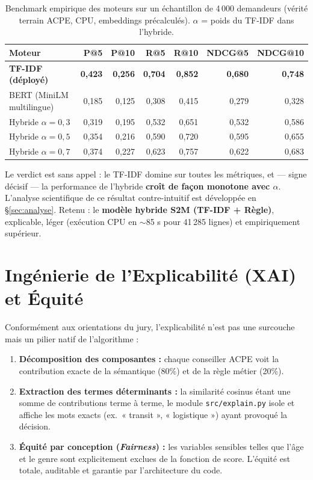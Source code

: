 \documentclass[11pt,a4paper]{article}
\begin{document}
\begin{table}[h]
\centering
\caption{Benchmark empirique des moteurs sur un échantillon de 4\,000 demandeurs (vérité terrain
ACPE, CPU, embeddings précalculés). $\alpha$ = poids du TF-IDF dans l'hybride.}
\label{tab:benchmark}
\small
\begin{tabular}{@{}lrrrrrr@{}}
\toprule
\textbf{Moteur} & \textbf{P@5} & \textbf{P@10} & \textbf{R@5} & \textbf{R@10} & \textbf{NDCG@5} & \textbf{NDCG@10} \\
\midrule
\textbf{TF-IDF (déployé)}          & \textbf{0,423} & \textbf{0,256} & \textbf{0,704} & \textbf{0,852} & \textbf{0,680} & \textbf{0,748} \\
BERT (MiniLM multilingue)          & 0,185 & 0,125 & 0,308 & 0,415 & 0,279 & 0,328 \\
Hybride $\alpha=0{,}3$             & 0,319 & 0,195 & 0,532 & 0,651 & 0,532 & 0,586 \\
Hybride $\alpha=0{,}5$             & 0,354 & 0,216 & 0,590 & 0,720 & 0,595 & 0,655 \\
Hybride $\alpha=0{,}7$             & 0,374 & 0,227 & 0,623 & 0,757 & 0,622 & 0,683 \\
\bottomrule
\end{tabular}
\end{table}

Le verdict est sans appel : le TF-IDF domine sur toutes les métriques, et — signe décisif — la
performance de l'hybride \textbf{croît de façon monotone avec $\alpha$}. L'analyse scientifique de
ce résultat contre-intuitif est développée en \S\ref{sec:analyse}. Retenu : le
\textbf{modèle hybride S2M (TF-IDF + Règle)}, explicable, léger (exécution CPU en $\sim$85 s pour
41\,285 lignes) et empiriquement supérieur.

\section{Ingénierie de l'Explicabilité (XAI) et Équité}
Conformément aux orientations du jury, l'explicabilité n'est pas une surcouche mais un pilier
natif de l'algorithme :
\begin{enumerate}
  \item \textbf{Décomposition des composantes :} chaque conseiller ACPE voit la contribution
  exacte de la sémantique (80\%) et de la règle métier (20\%).
  \item \textbf{Extraction des termes déterminants :} la similarité cosinus étant une somme de
  contributions terme à terme, le module \texttt{src/explain.py} isole et affiche les mots exacts
  (ex.\ « transit », « logistique ») ayant provoqué la décision.
  \item \textbf{Équité par conception (\emph{Fairness}) :} les variables sensibles telles que
  l'âge et le genre sont explicitement exclues de la fonction de score. L'équité est totale,
  auditable et garantie par l'architecture du code.
\end{enumerate}
\end{document}
